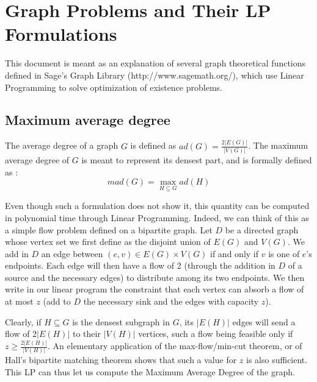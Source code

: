 
\chapter{Graph Problems and Their LP Formulations}

This document is meant as an explanation of several graph theoretical functions defined in Sage's Graph Library (http://www.sagemath.org/), which use Linear Programming to solve optimization of existence problems.



\section{Maximum average degree}
\label{lp:mad}

The average degree of a graph $G$ is defined as $ad(G) = \frac {2|E(G)|}{|V(G)|}$. The maximum average degree of $G$ is meant to represent its densest part, and is formally defined as : $$mad(G) = \max_{H\subseteq G}ad(H)$$

Even though such a formulation does not show it, this quantity can be computed in polynomial time through Linear Programming. Indeed, we can think of this as a simple flow problem defined on a bipartite graph. Let $D$ be a directed graph whose vertex set we first define as the disjoint union of $E(G)$ and $V(G)$. We add in $D$ an edge between $(e,v)\in E(G)\times V(G)$ if and only if $v$ is one of $e$'s endpoints. Each edge will then have a flow of 2 (through the addition in $D$ of a source and the necessary edges) to distribute among its two endpoints. We then write in our linear program the constraint that each vertex can absorb a flow of at most $z$ (add to $D$ the necessary sink and the edges with capacity $z$).

Clearly, if $H\subseteq G$ is the densest subgraph in $G$, its $|E(H)|$ edges will send a flow of $2|E(H)|$ to their $|V(H)|$ vertices, such a flow being feasible only if $z\geq \frac {2|E(H)|}{|V(H)|}$. An elementary application of the max-flow/min-cut theorem, or of Hall's bipartite matching theorem shows that such a value for $z$ is also sufficient. This LP can thus let us compute the Maximum Average Degree of the graph.

